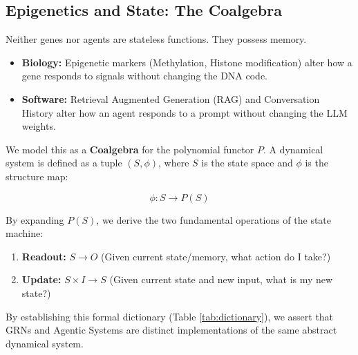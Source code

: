 \documentclass[11pt, a4paper]{article}
\begin{document}
\subsection{Epigenetics and State: The Coalgebra}

Neither genes nor agents are stateless functions. They possess memory.
\begin{itemize}
    \item \textbf{Biology:} Epigenetic markers (Methylation, Histone modification) alter how a gene responds to signals without changing the DNA code.
    \item \textbf{Software:} Retrieval Augmented Generation (RAG) and Conversation History alter how an agent responds to a prompt without changing the LLM weights.
\end{itemize}

We model this as a \textbf{Coalgebra} for the polynomial functor $P$. A dynamical system is defined as a tuple $(S, \phi)$, where $S$ is the state space and $\phi$ is the structure map:

\begin{equation}
    \phi: S \to P(S)
\end{equation}

By expanding $P(S)$, we derive the two fundamental operations of the state machine:
\begin{enumerate}
    \item \textbf{Readout:} $S \to O$ (Given current state/memory, what action do I take?)
    \item \textbf{Update:} $S \times I \to S$ (Given current state and new input, what is my new state?)
\end{enumerate}

By establishing this formal dictionary (Table \ref{tab:dictionary}), we assert that GRNs and Agentic Systems are distinct implementations of the same abstract dynamical system.
\end{document}
